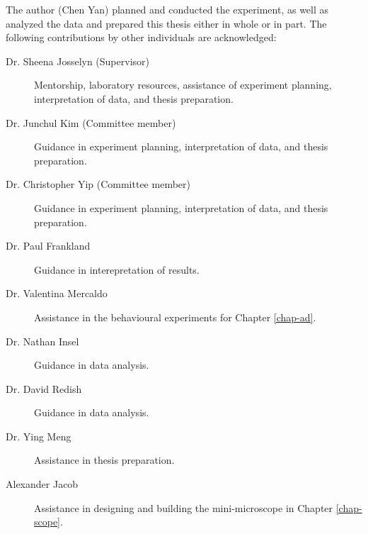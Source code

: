 The author (Chen Yan) planned and conducted the experiment, as well as analyzed the data and prepared this thesis either in whole or in part. The following contributions by other individuals are acknowledged:
\begin{description}

\item[Dr. Sheena Josselyn (Supervisor)] Mentorship, laboratory resources, assistance of experiment planning, interpretation of data, and thesis preparation.

\item[Dr. Junchul Kim (Committee member)] Guidance in experiment planning, interpretation of data, and thesis preparation.

\item[Dr. Christopher Yip (Committee member)] Guidance in experiment planning, interpretation of data, and thesis preparation.

\item[Dr. Paul Frankland] Guidance in interepretation of results.

\item[Dr. Valentina Mercaldo] Assistance in the behavioural experiments for Chapter \ref{chap-ad}.

\item[Dr. Nathan Insel] Guidance in data analysis.

\item[Dr. David Redish] Guidance in data analysis. 

\item[Dr. Ying Meng] Assistance in thesis preparation.

\item[Alexander Jacob] Assistance in designing and building the mini-microscope in Chapter \ref{chap-scope}.

\end{description}
